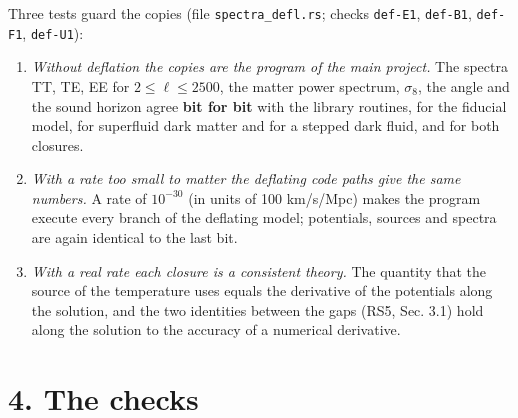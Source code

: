 \documentclass[
  10pt,
]{article}
\providecommand{\tightlist}{%
  \setlength{\itemsep}{0pt}\setlength{\parskip}{0pt}}
\begin{document}
Three tests guard the copies (file \texttt{spectra\_defl.rs}; checks
\texttt{def-E1}, \texttt{def-B1}, \texttt{def-F1}, \texttt{def-U1}):

\begin{enumerate}
\def\labelenumi{\arabic{enumi}.}
\tightlist
\item
  \emph{Without deflation the copies are the program of the main
  project.} The spectra TT, TE, EE for \(2\le\ell\le2500\), the matter
  power spectrum, \(\sigma_8\), the angle and the sound horizon agree
  \textbf{bit for bit} with the library routines, for the fiducial
  model, for superfluid dark matter and for a stepped dark fluid, and
  for both closures.
\item
  \emph{With a rate too small to matter the deflating code paths give
  the same numbers.} A rate of \(10^{-30}\) (in units of 100 km/s/Mpc)
  makes the program execute every branch of the deflating model;
  potentials, sources and spectra are again identical to the last bit.
\item
  \emph{With a real rate each closure is a consistent theory.} The
  quantity that the source of the temperature uses equals the derivative
  of the potentials along the solution, and the two identities between
  the gaps (RS5, Sec. 3.1) hold along the solution to the accuracy of a
  numerical derivative.
\end{enumerate}

\hypertarget{the-checks}{%
\section{4. The checks}\label{the-checks}}
\end{document}
